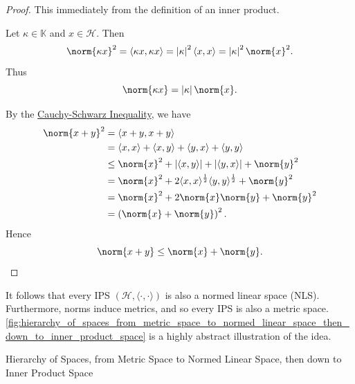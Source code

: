 \documentclass[notoc,notitlepage]{tufte-book}
\begin{document}
\begin{proof}
  This immediately from the definition of an inner product.

  \noindent
  Let $\kappa \in \mathbb{K}$ and $x \in \mathcal{H}$. Then
  \begin{equation*}
    \norm{\kappa x}^2 = \langle \kappa x, \kappa x \rangle
                = \abs{\kappa}^2 \langle x, x \rangle
                = \abs{\kappa}^2 \norm{x}^2.
  \end{equation*}
  Thus
  \begin{equation*}
    \norm{\kappa x} = \abs{\kappa} \norm{x}.
  \end{equation*}

  \noindent
  By the \hyperref[thm:cauchy_schwarz_inequality]{Cauchy-Schwarz Inequality},
  we have
  \begin{align*}
    \norm{x + y}^2
    &= \langle x + y, x + y \rangle \\
    &= \langle x, x \rangle + \langle x, y \rangle + \langle y, x \rangle + \langle y, y \rangle \\
    &\leq \norm{x}^2 + \abs{\langle x, y \rangle} + \abs{\langle y, x \rangle} + \norm{y}^2 \\
    &= \norm{x}^2
      + 2 \langle x, x \rangle^{\frac{1}{2}} \langle y, y \rangle^{\frac{1}{2}} 
      + \norm{y}^2 \\
    &= \norm{x}^2 + 2 \norm{x} \norm{y} + \norm{y}^2 \\
    &= \left( \norm{x} + \norm{y} \right)^2.
  \end{align*}
  Hence
  \begin{equation*}
    \norm{x + y} \leq \norm{x} + \norm{y}.
  \end{equation*}
\end{proof}

It follows that every IPS $(\mathcal{H}, \langle \cdot, \cdot \rangle)$ 
is also a normed linear space (NLS).
Furthermore, norms induce metrics, and so
every IPS is also a metric space.
\cref{fig:hierarchy_of_spaces_from_metric_space_to_normed_linear_space_then_down_to_inner_product_space}
is a highly abstract illustration of the idea.

\begin{marginfigure}
  \centering
  
  \caption{Hierarchy of Spaces, from Metric Space to Normed Linear Space, then
  down to Inner Product Space}
  \label{fig:hierarchy_of_spaces_from_metric_space_to_normed_linear_space_then_down_to_inner_product_space}
\end{marginfigure}
\end{document}
